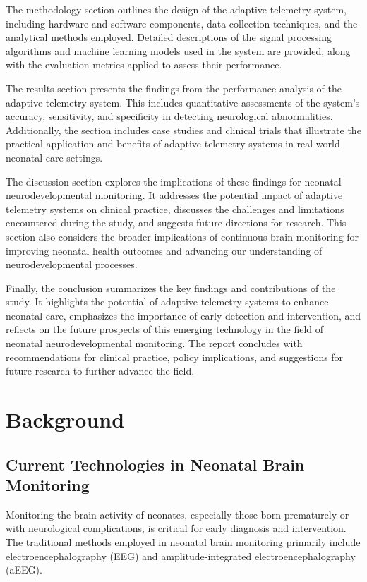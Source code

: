 \documentclass[12pt,journal,compsoc]{IEEEtran}
\begin{document}
The methodology section outlines the design of the adaptive telemetry system, including hardware and software components, data collection techniques, and the analytical methods employed. Detailed descriptions of the signal processing algorithms and machine learning models used in the system are provided, along with the evaluation metrics applied to assess their performance.

The results section presents the findings from the performance analysis of the adaptive telemetry system. This includes quantitative assessments of the system's accuracy, sensitivity, and specificity in detecting neurological abnormalities. Additionally, the section includes case studies and clinical trials that illustrate the practical application and benefits of adaptive telemetry systems in real-world neonatal care settings.

The discussion section explores the implications of these findings for neonatal neurodevelopmental monitoring. It addresses the potential impact of adaptive telemetry systems on clinical practice, discusses the challenges and limitations encountered during the study, and suggests future directions for research. This section also considers the broader implications of continuous brain monitoring for improving neonatal health outcomes and advancing our understanding of neurodevelopmental processes.

Finally, the conclusion summarizes the key findings and contributions of the study. It highlights the potential of adaptive telemetry systems to enhance neonatal care, emphasizes the importance of early detection and intervention, and reflects on the future prospects of this emerging technology in the field of neonatal neurodevelopmental monitoring. The report concludes with recommendations for clinical practice, policy implications, and suggestions for future research to further advance the field.

\section{Background}

\subsection{Current Technologies in Neonatal Brain Monitoring}

Monitoring the brain activity of neonates, especially those born prematurely or with neurological complications, is critical for early diagnosis and intervention. The traditional methods employed in neonatal brain monitoring primarily include electroencephalography (EEG) and amplitude-integrated electroencephalography (aEEG).
\end{document}
